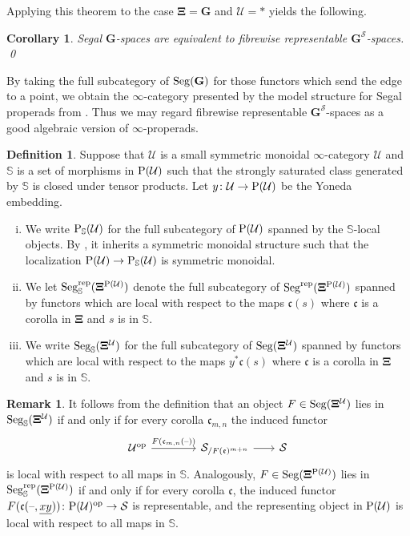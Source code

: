 \documentclass{amsart}
\numberwithin{theorem}{subsection}
\newtheorem{cor}[theorem]{Corollary}
\theoremstyle{definition}
\newtheorem{definition}[theorem]{Definition}
\newtheorem{remark}[theorem]{Remark}
\providecommand{\op}{\mathrm{op}}
\newcommand{\xS}{\mathcal{S}}
\newcommand{\xU}{\mathcal{U}}
\newcommand{\xfe}{\mathfrak{e}}
\newcommand{\xfc}{\mathfrak{c}}
\newcommand{\Pre}{\name{P}}
\newcommand{\PSU}{\Pre_{\mathbb{S}}(\xU)}
\newcommand{\icat}{$\infty$-category}
\newcommand{\name}[1]{\ensuremath{\text{\textup{#1}}}}
\newcommand{\bbY}{\mathbf{G}}
\newcommand{\gc}{\mathbf{\Xi}}
\newcommand{\gcU}{\gc^{\xU}}
\newcommand{\gcPU}{\gc^{\Pre(\xU)}}
\newcommand{\Seg}{\name{Seg}}
\newcommand{\blank}{\text{\textendash}}
\newcommand{\IFF}{if and only if}
\newcommand{\Segrep}{\Seg^{\name{rep}}}
\newcommand{\SegS}{\Seg_{\mathbb{S}}}
\newcommand{\SegrepS}{\Seg^{\name{rep}}_{\mathbb{S}}}
\begin{document}
Applying this theorem to the case $\gc=\bbY$ and $\xU = *$ yields the following.
\begin{cor}\label{cor hry equ}
Segal $\bbY$-spaces are equivalent to fibrewise representable $\bbY^{\xS}$-spaces. \qed
\end{cor}

By taking the full subcategory of $\Seg(\bbY)$ for those functors which send the edge to a point, we obtain the \icat{} presented by the model structure for Segal properads from \cite[Theorem 5.3]{hry_factorizations}.
Thus we may regard fibrewise representable $\bbY^{\xS}$-spaces as a good algebraic version of $\infty$-properads.

\begin{definition}\label{def S properads}
Suppose that $\xU$ is a small symmetric monoidal $\infty$-category $\xU$ and $\mathbb{S}$ is a set of morphisms in $\Pre(\xU)$ such that the strongly saturated class generated by $\mathbb{S}$ is closed under tensor products. 
Let $y\colon \xU\to \Pre(\xU)$ be the Yoneda embedding.
	\begin{enumerate}[(i)]
		\item We write $\PSU$ for the full subcategory of $\Pre(\xU)$ spanned by the $\mathbb{S}$-local objects. 
		By \cite[Proposition 2.2.1.9]{ha}, it inherits a symmetric monoidal structure such that the localization $\Pre(\xU) \to \PSU$ is symmetric monoidal.
		\item We let $\SegrepS(\gcPU)$ denote the full subcategory of $\Segrep(\gcPU)$ spanned by functors which are local with respect to the maps $\xfc(s)$ where $\xfc$ is a corolla in $\gc$ and $s$ is in $\mathbb{S}$.
	\item We write $\SegS(\gcU)$ for the full subcategory of $\Seg(\gcU)$ spanned by functors which are local with respect to the maps $y^*\xfc(s)$ where $\xfc$ is a corolla in $\gc$ and $s$ is in $\mathbb{S}$.
	\end{enumerate}
\end{definition}

\begin{remark}\label{rmk S-seg repr}
	It follows from the definition that an object $F \in \Seg(\gcU)$ lies in $\SegS(\gcU)$ \IFF{} for every corolla $\xfc_{m,n}$ the induced functor \[ 
	\begin{tikzcd}
	\xU^{\op} \rar{F(\xfc_{m,n}(\blank))} &[+1.6em]
	\xS_{/F(\xfe)^{m+n}} \rar &[-0.5em] \xS
	\end{tikzcd}
	\] is local with respect to all maps in $\mathbb S$.
	Analogously, $F \in \Seg(\gcPU)$ lies in $\SegrepS(\gcPU)$ \IFF{} for every corolla $\xfc$, the induced functor $F(\xfc(\blank, \underline{xy})) \colon
	\Pre(\xU)^{\op} \to \xS$ is representable, and the representing object in $\Pre(\xU)$ is local with respect to all maps in $\mathbb{S}$.
\end{remark}
\end{document}
